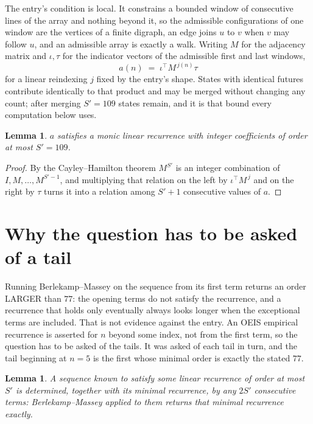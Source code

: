 \documentclass[11pt,a4paper]{article}
\theoremstyle{plain}
\newtheorem{lemma}[theorem]{Lemma}
\theoremstyle{definition}
\begin{document}
The entry's condition is local. It constrains a bounded window of consecutive lines of the
array and nothing beyond it, so the admissible configurations of one window are the vertices of
a finite digraph, an edge joins $u$ to $v$ when $v$ may follow $u$, and an admissible array is
exactly a walk. Writing $M$ for the adjacency matrix and $\iota,\tau$ for the indicator vectors
of the admissible first and last windows,
\[
a(n)\;=\;\iota^{\!\top}M^{\,j(n)}\tau
\]
for a linear reindexing $j$ fixed by the entry's shape. States with identical futures
contribute identically to that product and may be merged without changing any count; after
merging $S'=109$ states remain, and it is that bound every computation below uses.

\begin{lemma}\label{lem:cf}
$a$ satisfies a monic linear recurrence with integer coefficients of order at most $S'=109$.
\end{lemma}

\begin{proof}
By the Cayley--Hamilton theorem $M^{S'}$ is an integer combination of $I,M,\dots,M^{S'-1}$,
and multiplying that relation on the left by $\iota^{\!\top}M^{\,j}$ and on the right by
$\tau$ turns it into a relation among $S'+1$ consecutive values of $a$.
\end{proof}

\section{Why the question has to be asked of a tail}

Running Berlekamp--Massey on the sequence from its first term returns an order LARGER than $77$: the opening terms do not satisfy the recurrence, and a recurrence that holds only eventually always looks longer when the exceptional terms are included. That is not evidence against the entry. An OEIS empirical recurrence is asserted for $n$ beyond some index, not from the first term, so the question has to be asked of the tails. It was asked of each tail in turn, and the tail beginning at $n=5$ is the first whose minimal order is exactly the stated $77$.

\begin{lemma}\label{lem:bm}
A sequence known to satisfy some linear recurrence of order at most $S'$ is determined,
together with its minimal recurrence, by any $2S'$ consecutive terms: Berlekamp--Massey applied
to them returns that minimal recurrence exactly.
\end{lemma}
\end{document}
